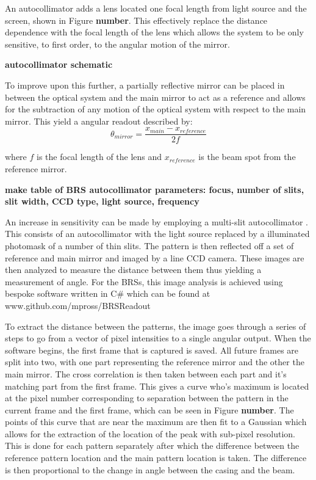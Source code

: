 \documentclass [12pt, proquest]{uwthesis}[2019]
\begin{document}
An autocollimator adds a lens located one focal length from light source and the screen, shown in Figure \textbf{number}. This effectively replace the distance dependence with the focal length of the lens which allows the system to be only sensitive, to first order, to the angular motion of the mirror.

\textbf{autocollimator schematic}

To improve upon this further, a partially reflective mirror can be placed in between the optical system and the main mirror to act as a reference and allows for the subtraction of any motion of the optical system with respect to the main mirror. This yield a angular readout described by:
\[\theta_{mirror}=\frac{x_{main}-x_{reference}}{2f}\]

where $f$ is the focal length of the lens and $x_{reference}$ is the beam spot from the reference mirror.

\textbf{make table of BRS autocollimator parameters: focus, number of slits, slit width, CCD type, light source, frequency}

An increase in sensitivity can be made by employing a multi-slit autocollimator \cite{MSA}. This consists of an autocollimator with the light source replaced by a illuminated photomask of a number of thin slits. The pattern is then reflected off a set of reference and main mirror and imaged by a line CCD camera. These images are then analyzed to measure the distance between them thus yielding a measurement of angle. For the BRSs, this image analysis is achieved using bespoke software written in C\# which can be found at www.github.com/mpross/BRSReadout

To extract the distance between the patterns, the image goes through a series of steps to go from a vector of pixel intensities to a single angular output. When the software begins, the first frame that is captured is saved. All future frames are split into two, with one part representing the reference mirror and the other the main mirror. The cross correlation is then taken between each part and it's matching part from the first frame. This gives a curve who's maximum is located at the pixel number corresponding to separation between the pattern in the current frame and the first frame, which can be seen in Figure \textbf{number}. The points of this curve that are near the maximum are then fit to a Gaussian which allows for the extraction of the location of the peak with sub-pixel resolution. This is done for each pattern separately after which the difference between the reference pattern location and the main pattern location is taken. The difference is then proportional to the change in angle between the casing and the beam.
\end{document}
